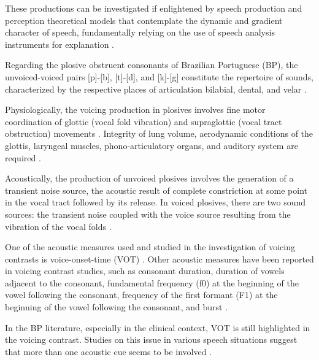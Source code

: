 These productions can be investigated if enlightened by speech production and
perception theoretical models that contemplate the dynamic and gradient
character of speech, fundamentally relying on the use of speech analysis
instruments for explanation \citep{silva2001,gregio2011,albano2007,silva2010}.

Regarding the plosive obstruent consonants of Brazilian Portuguese (BP), the
unvoiced-voiced pairs [p]-[b], [t]-[d], and [k]-[g] constitute the repertoire
of sounds, characterized by the respective places of articulation bilabial,
dental, and velar \citep{silva2001,camargo2008}.

Physiologically, the voicing production in plosives involves fine motor
coordination of glottic (vocal fold vibration) and supraglottic (vocal tract
obstruction) movements \citep{sweeting_voice_1982,shimizu1996,gregio2005}.
Integrity of lung volume, aerodynamic conditions of the glottis,
laryngeal muscles, phono-articulatory organs, and auditory system are required
\citep{hoit1993,shimizu1996,hoole1999}.

Acoustically, the production of unvoiced plosives involves the generation of a
transient noise source, the acoustic result of complete constriction at some
point in the vocal tract followed by its release. In voiced plosives, there are
two sound sources: the transient noise coupled with the voice source resulting
from the vibration of the vocal folds \citep{kent1992,johnson2003}.

One of the acoustic measures used and studied in the investigation of voicing
contrasts is voice-onset-time (VOT) \citep{lisker1964,behlau,kent1992,levy1993,shimizu1996,cho1999,camargo2000,rocca2003}.
Other acoustic measures
have been reported in voicing contrast studies, such as consonant duration,
duration of vowels adjacent to the consonant, fundamental frequency (f0) at the
beginning of the vowel following the consonant, frequency of the first formant
(F1) at the beginning of the vowel following the consonant, and burst 
\citep{barton1980,shimizu1996,veloso1997,van_alphen2004,benki2005,lousada2005,barroco_2007,whalen2007,morris2008,hanson2009,tachibana2012}.

In the BP literature, especially in the clinical context, VOT is still
highlighted in the voicing contrast. Studies on this issue in various speech
situations suggest that more than one acoustic cue seems to be involved
\citep{behlau,levy1993,barbosa1996,madureira,ficker2003,gregio2005,gurgueira2006,barzaghi2007,bonatto2007,britto2010,gregio2011,schliemann2011,souza2010,berti2012,melo2012,pereira2012}.

